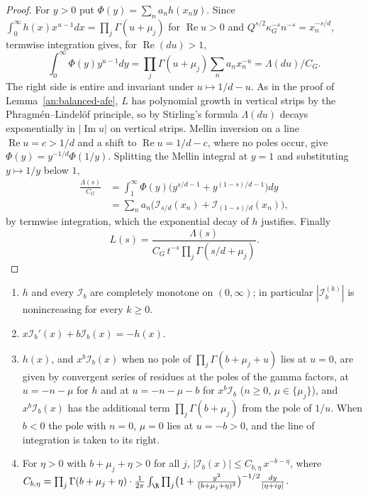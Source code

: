 \begin{proof}
For $y>0$ put $\Phi(y)=\sum_na_nh(x_ny)$. Since
$\int_0^\infty h(x)x^{u-1}dx=\prod_j\Gamma(u+\mu_j)$ for $\operatorname{Re}u>0$
and $Q^{s/2}\kappa_G^{-s}n^{-s}=x_n^{-s/d}$, termwise integration gives, for
$\operatorname{Re}(du)>1$,
\[
 \int_0^\infty\Phi(y)y^{u-1}dy=\prod_j\Gamma(u+\mu_j)\sum_na_nx_n^{-u}
 =\Lambda(du)/C_G.
\]
The right side is entire and invariant under $u\mapsto1/d-u$. As in the
proof of Lemma~\ref{an:balanced-afe}, $L$ has polynomial growth in vertical
strips by the Phragm\'en--Lindel\"of principle, so by Stirling's formula
$\Lambda(du)$ decays exponentially in $|\operatorname{Im}u|$ on vertical
strips. Mellin inversion on a line $\operatorname{Re}u=c>1/d$ and a shift to
$\operatorname{Re}u=1/d-c$, where no poles occur, give
$\Phi(y)=y^{-1/d}\Phi(1/y)$. Splitting the Mellin integral at $y=1$ and
substituting $y\mapsto1/y$ below $1$,
\begin{align*}
 \frac{\Lambda(s)}{C_G}&=\int_1^\infty\Phi(y)\bigl(y^{s/d-1}+y^{(1-s)/d-1}\bigr)dy\\
 &=\sum_na_n\bigl(\mathcal I_{s/d}(x_n)+\mathcal I_{(1-s)/d}(x_n)\bigr),
\end{align*}
by termwise integration, which the exponential decay of $h$ justifies.
Finally
\[
 L(s)=\frac{\Lambda(s)}{C_G\,t^{-s}\prod_j\Gamma(s/d+\mu_j)}.
\]
\end{proof}

\begin{lemma}\label{lv:kernel}
\begin{enumerate}
\item[(a)] $h$ and every $\mathcal I_b$ are completely monotone on
 $(0,\infty)$; in particular $|\mathcal I_b^{(k)}|$ is nonincreasing for every
 $k\ge0$.
\item[(b)] $x\mathcal I_b'(x)+b\mathcal I_b(x)=-h(x)$.
\item[(c)] $h(x)$, and $x^b\mathcal I_b(x)$ when no pole of
 $\prod_j\Gamma(b+\mu_j+u)$ lies at $u=0$, are given by convergent series of
 residues at the poles of the gamma factors, at $u=-n-\mu$ for $h$ and at
 $u=-n-\mu-b$ for $x^b\mathcal I_b$ ($n\ge0$, $\mu\in\{\mu_j\}$), and
 $x^b\mathcal I_b(x)$ has the additional term $\prod_j\Gamma(b+\mu_j)$ from
 the pole of $1/u$. When $b<0$ the pole with $n=0$, $\mu=0$ lies at $u=-b>0$,
 and the line of integration is taken to its right.
\item[(d)] For $\eta>0$ with $b+\mu_j+\eta>0$ for all $j$,
 $|\mathcal I_b(x)|\le C_{b,\eta}\,x^{-b-\eta}$, where
 $C_{b,\eta}=\prod_j\Gamma(b+\mu_j+\eta)\cdot\frac1{2\pi}\int_\R
 \prod_j\bigl(1+\tfrac{y^2}{(b+\mu_j+\eta)^2}\bigr)^{-1/2}\frac{dy}{|\eta+iy|}$.
\end{enumerate}
\end{lemma}


